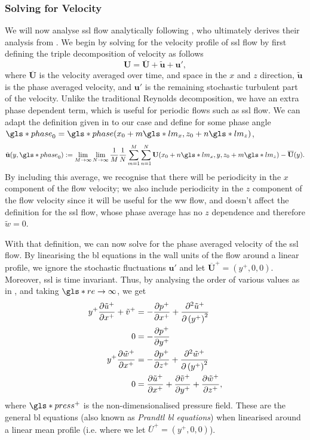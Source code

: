 \subsubsection{Solving for Velocity}
We will now analyse \gls{ssl} flow analytically following \textcite{chernyshenko2013}, who ultimately derives their analysis from \textcite{viotti2009}. We begin by solving for the velocity profile of \gls{ssl} flow by first defining the triple decomposition of velocity as follows
\begin{equation}
	\mathbf{U} = \overline{\mathbf{U} }+\tilde{\mathbf{u} }+\mathbf{u'}  
,\end{equation}
where $\overline{\mathbf{U} }$ is the velocity averaged over time, and space in the $x$ and  $z$ direction, $\tilde{\mathbf{u} }$ is the phase averaged velocity, and $\mathbf{u'} $ is the remaining stochastic turbulent part of the velocity. Unlike the traditional Reynolds decomposition, we have an extra phase dependent term, which is useful for periodic flows such as \gls{ssl} flow. We can adapt the definition given in \cite{baj2015} to our case and define for some phase angle $\gls*{phase}_0=\gls*{phase}(x_0+m \gls*{lm}_x,z_0+n \gls*{lm}_z)$,
\begin{equation}
	\tilde{\mathbf{u} }(y,\gls*{phase}_0):=\lim_{M\to\infty}\lim_{N\to\infty}\frac{1}{M}\frac{1}{N} \sum_{m=1}^{M} \sum_{n=1}^{N} \mathbf{U}(x_0+n \gls*{lm}_x,y,z_0 +m \gls*{lm}_z)-\overline{\mathbf{U} }(y)  
.\end{equation}
By including this average, we recognise that there will be periodicity in the $x$ component of the flow velocity; we also include periodicity in the $z$ component of the flow velocity since it will be useful for the \gls{ww} flow, and doesn't affect the definition for the \gls{ssl} flow, whose phase average has no $z$ dependence and therefore $\tilde{w}=0$.

With that definition, we can now solve for the phase averaged velocity of the \gls{ssl} flow. By linearising the \gls{bl} equations in the wall units of the flow around a linear profile, we ignore the stochastic fluctuations $\mathbf{u'} $ and let $\overline{\mathbf{U} }^{+} = (y^{+},0,0)$. Moreover, \gls{ssl} is time invariant. Thus, by analysing the order of various values as in \cite{schlichting2016}, and taking $\gls*{re}\to \infty$, we get
\begin{align}
	y^{+} \pdv{\tilde{u}^{+}}{x^{+}} + \tilde{v}^{+} &= -\pdv{p^{+}}{x^{+}} + \pdv[2]{\tilde{u}^{+}}{\left(y^{+}\right)} \label{eq:blx}\\
	0 &= -\pdv{p^{+}}{y^{+}}  \label{eq:bly}\\
	y^{+} \pdv{\tilde{w}^{+}}{x^{+}} &= -\pdv{p^{+}}{z^{+}} + \pdv[2]{\tilde{w}^{+}}{\left( y^{+} \right) } \label{eq:blz}\\
	0 &= \pdv{\tilde{u}^{+}}{x^{+}} +\pdv{\tilde{v}^{+}}{y^{+}} +\pdv{\tilde{w}^{+}}{z^{+}} \label{eq:blc}
,\end{align}
where $\gls*{press}^{+}$ is the non-dimensionalised pressure field. These are the general \gls{bl} equations (also known as \textit{Prandtl \gls{bl} equations}) when linearised around a linear mean profile (i.e. where we let $\overline{U}^{+}=(y^{+},0,0)$).


